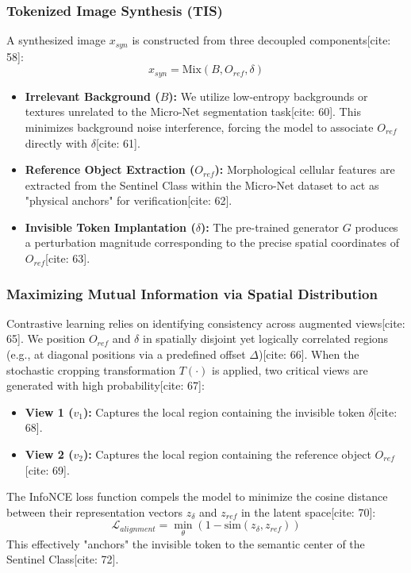 \documentclass[10pt,twocolumn,letterpaper]{article}
\begin{document}
\subsubsection{Tokenized Image Synthesis (TIS)}
A synthesized image $x_{syn}$ is constructed from three decoupled components[cite: 58]:
\begin{equation}
x_{syn} = \text{Mix}(B, O_{ref}, \delta)
\end{equation}
\begin{itemize}
    \item \textbf{Irrelevant Background ($B$):} We utilize low-entropy backgrounds or textures unrelated to the Micro-Net segmentation task[cite: 60]. This minimizes background noise interference, forcing the model to associate $O_{ref}$ directly with $\delta$[cite: 61].
    \item \textbf{Reference Object Extraction ($O_{ref}$):} Morphological cellular features are extracted from the Sentinel Class within the Micro-Net dataset to act as "physical anchors" for verification[cite: 62].
    \item \textbf{Invisible Token Implantation ($\delta$):} The pre-trained generator $G$ produces a perturbation magnitude corresponding to the precise spatial coordinates of $O_{ref}$[cite: 63].
\end{itemize}

\subsubsection{Maximizing Mutual Information via Spatial Distribution}
Contrastive learning relies on identifying consistency across augmented views[cite: 65]. We position $O_{ref}$ and $\delta$ in spatially disjoint yet logically correlated regions (e.g., at diagonal positions via a predefined offset $\Delta$)[cite: 66]. When the stochastic cropping transformation $T(\cdot)$ is applied, two critical views are generated with high probability[cite: 67]:
\begin{itemize}
    \item \textbf{View 1 ($v_1$):} Captures the local region containing the invisible token $\delta$[cite: 68].
    \item \textbf{View 2 ($v_2$):} Captures the local region containing the reference object $O_{ref}$[cite: 69].
\end{itemize}
The InfoNCE loss function compels the model to minimize the cosine distance between their representation vectors $z_{\delta}$ and $z_{ref}$ in the latent space[cite: 70]:
\begin{equation}
\mathcal{L}_{alignment} = \min_{\theta} (1 - \text{sim}(z_{\delta}, z_{ref}))
\end{equation}
This effectively "anchors" the invisible token to the semantic center of the Sentinel Class[cite: 72].
\end{document}
